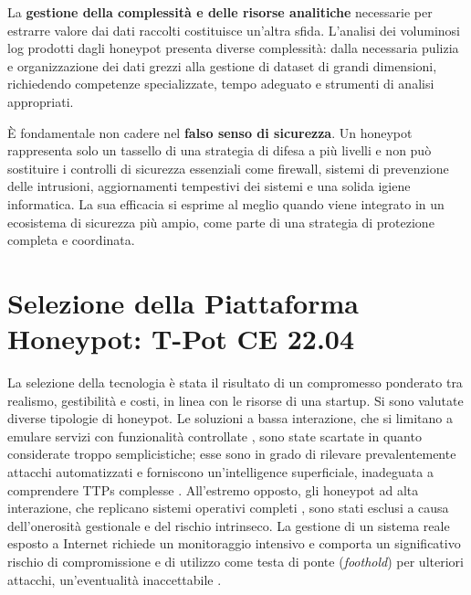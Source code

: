 La \textbf{gestione della complessità e delle risorse analitiche} necessarie per estrarre valore dai dati raccolti costituisce un'altra sfida. L'analisi dei voluminosi log prodotti dagli honeypot presenta diverse complessità: dalla necessaria pulizia e organizzazione dei dati grezzi alla gestione di dataset di grandi dimensioni, richiedendo competenze specializzate, tempo adeguato e strumenti di analisi appropriati.

È fondamentale non cadere nel \textbf{falso senso di sicurezza}. Un honeypot rappresenta solo un tassello di una strategia di difesa a più livelli e non può sostituire i controlli di sicurezza essenziali come firewall, sistemi di prevenzione delle intrusioni, aggiornamenti tempestivi dei sistemi e una solida igiene informatica. La sua efficacia si esprime al meglio quando viene integrato in un ecosistema di sicurezza più ampio, come parte di una strategia di protezione completa e coordinata\cite{mairh2011}.


\section{Selezione della Piattaforma Honeypot: T-Pot CE 22.04}
\label{sec:selezione_piattaforma}

La selezione della tecnologia è stata il risultato di un compromesso ponderato tra realismo, gestibilità e costi, in linea con le risorse di una startup. Si sono valutate diverse tipologie di honeypot. Le soluzioni a bassa interazione, che si limitano a emulare servizi con funzionalità controllate \cite{vito2024}, sono state scartate in quanto considerate troppo semplicistiche; esse sono in grado di rilevare prevalentemente attacchi automatizzati e forniscono un'intelligence superficiale, inadeguata a comprendere TTPs complesse \cite{gadapa_sai_devineni_reddy_bommu_busi}. All'estremo opposto, gli honeypot ad alta interazione, che replicano sistemi operativi completi \cite{vito2024}, sono stati esclusi a causa dell'onerosità gestionale e del rischio intrinseco. La gestione di un sistema reale esposto a Internet richiede un monitoraggio intensivo e comporta un significativo rischio di compromissione e di utilizzo come testa di ponte (\textit{foothold}) per ulteriori attacchi, un'eventualità inaccettabile \cite{tsang_2022}.

